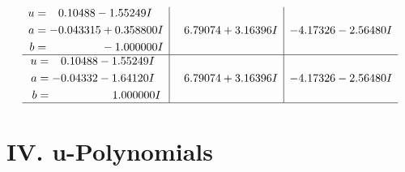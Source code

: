 \documentclass[1p]{elsarticle_modified}
\theoremstyle{definition}
\begin{document}
$$\begin{array}{c|c|c}
\begin{aligned}
u &= \phantom{-}0.10488 - 1.55249 I \\
a &= -0.043315 + 0.358800 I \\
b &= \phantom{-0.000000 } -1.000000 I\end{aligned}
 & \phantom{-}6.79074 + 3.16396 I & -4.17326 - 2.56480 I \\ \hline\begin{aligned}
u &= \phantom{-}0.10488 - 1.55249 I \\
a &= -0.04332 - 1.64120 I \\
b &= \phantom{-0.000000 -}1.000000 I\end{aligned}
 & \phantom{-}6.79074 + 3.16396 I & -4.17326 - 2.56480 I\\
 \hline 
 \end{array}$$\newpage
\newpage\renewcommand{\arraystretch}{1}
\centering \section*{ IV. u-Polynomials}
\end{document}
